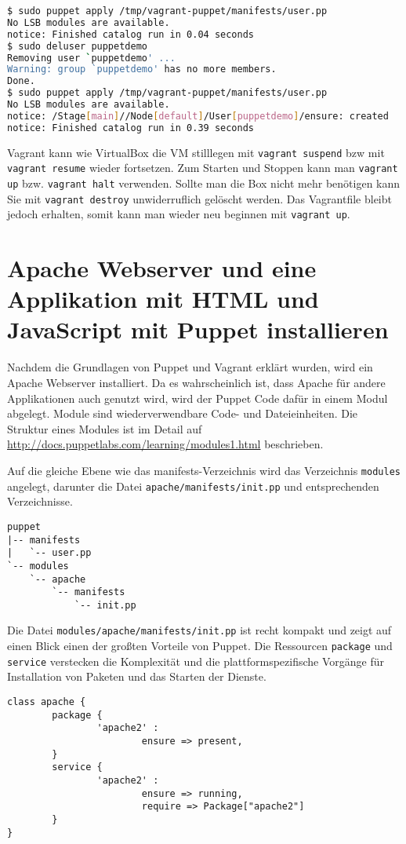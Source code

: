 \documentclass[12pt,a4paper,ngerman]{article}
\begin{document}
\begin{lstlisting}[language=sh,caption=Puppet apply im Box, label=vagrant-apply]
$ sudo puppet apply /tmp/vagrant-puppet/manifests/user.pp
No LSB modules are available.
notice: Finished catalog run in 0.04 seconds
$ sudo deluser puppetdemo
Removing user `puppetdemo' ...
Warning: group `puppetdemo' has no more members.
Done.
$ sudo puppet apply /tmp/vagrant-puppet/manifests/user.pp
No LSB modules are available.
notice: /Stage[main]//Node[default]/User[puppetdemo]/ensure: created
notice: Finished catalog run in 0.39 seconds
\end{lstlisting}

Vagrant kann wie VirtualBox die VM stilllegen mit \lstinline$vagrant suspend$ bzw mit \lstinline$vagrant resume$ wieder fortsetzen. Zum Starten und Stoppen kann man \lstinline$vagrant up$ bzw. \lstinline$vagrant halt$ verwenden.  Sollte man die Box nicht mehr benötigen kann Sie mit \lstinline$vagrant destroy$ unwiderruflich gelöscht werden. Das Vagrantfile bleibt jedoch erhalten, somit kann man wieder neu beginnen mit \lstinline$vagrant up$. 

\section{Apache Webserver und eine Applikation mit HTML und JavaScript mit Puppet installieren}
Nachdem die Grundlagen von Puppet und Vagrant erklärt wurden, wird ein Apache Webserver installiert. Da es wahrscheinlich ist, dass Apache für andere Applikationen auch genutzt wird, wird der Puppet Code dafür in einem Modul abgelegt. Module sind wiederverwendbare Code- und Dateieinheiten. Die Struktur eines Modules ist im Detail auf \url{http://docs.puppetlabs.com/learning/modules1.html} beschrieben.


Auf die gleiche Ebene wie das manifests-Verzeichnis wird das Verzeichnis \lstinline$modules$ angelegt, darunter die Datei \lstinline$apache/manifests/init.pp$ und entsprechenden Verzeichnisse.
\begin{lstlisting}[language=tree,caption=Verzeichnisstruktur für den apache-Module, label=apache-module]
puppet
|-- manifests
|   `-- user.pp
`-- modules
    `-- apache
        `-- manifests
            `-- init.pp
\end{lstlisting}

Die Datei \lstinline$modules/apache/manifests/init.pp$ ist recht kompakt und zeigt auf einen Blick einen der großten Vorteile von Puppet. Die Ressourcen \lstinline$package$ und \lstinline$service$ verstecken die Komplexität und die plattformspezifische Vorgänge für Installation von Paketen und das Starten der Dienste.
\begin{lstlisting}[language=puppet,caption=Inhalt von modules/apache/manifests/init.pp, label=apache-init.pp]
class apache {
        package {
                'apache2' :
                        ensure => present,
        }
        service {
                'apache2' :
                        ensure => running,
                        require => Package["apache2"]
        }
}
\end{lstlisting}
\end{document}
